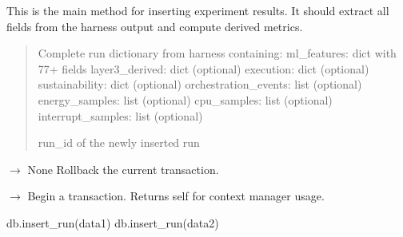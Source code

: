 \documentclass[letterpaper,10pt,english]{sphinxmanual}
\begin{document}
\begin{fulllineitems}
\begin{fulllineitems}
\sphinxAtStartPar
This is the main method for inserting experiment results.
It should extract all fields from the harness output and
compute derived metrics.
\begin{quote}\begin{description}
\sphinxAtStartPar
{} \textendash{} Complete run dictionary from harness containing:
\sphinxhyphen{} ml\_features: dict with 77+ fields
\sphinxhyphen{} layer3\_derived: dict (optional)
\sphinxhyphen{} execution: dict (optional)
\sphinxhyphen{} sustainability: dict (optional)
\sphinxhyphen{} orchestration\_events: list (optional)
\sphinxhyphen{} energy\_samples: list (optional)
\sphinxhyphen{} cpu\_samples: list (optional)
\sphinxhyphen{} interrupt\_samples: list (optional)

\sphinxAtStartPar
run\_id of the newly inserted run

\end{description}\end{quote}

\end{fulllineitems}


\begin{fulllineitems}
\label{\detokenize{core.database.base:core.database.base.DatabaseInterface.rollback}}
\pysigstartsignatures
\pysiglinewithargsret
{}
{}
{{ $\rightarrow$ None}}
\pysigstopsignatures
\sphinxAtStartPar
Rollback the current transaction.

\end{fulllineitems}


\begin{fulllineitems}
\label{\detokenize{core.database.base:core.database.base.DatabaseInterface.transaction}}
\pysigstartsignatures
\pysiglinewithargsret
{}
{}
{{ $\rightarrow$ {\hyperref[\detokenize{core.database.base:core.database.base.DatabaseInterface}]{}}}}
\pysigstopsignatures
\sphinxAtStartPar
Begin a transaction. Returns self for context manager usage.
\begin{description}
\begin{description}
\sphinxAtStartPar
db.insert\_run(data1)
db.insert\_run(data2)


\end{description}
\end{description}
\end{fulllineitems}
\end{fulllineitems}
\end{document}
